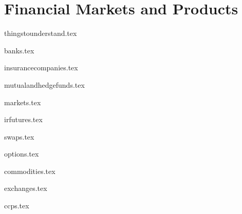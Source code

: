 \documentclass{report}
\begin{document}
	

\tableofcontents		

\part{Financial Markets and Products}

{thingstounderstand.tex}
\pagebreak

{banks.tex}
\pagebreak

{insurancecompanies.tex}
\pagebreak

{mutualandhedgefunds.tex}
\pagebreak

{markets.tex}
\pagebreak

{irfutures.tex}
\pagebreak

{swaps.tex}
\pagebreak

{options.tex}
\pagebreak

{commodities.tex}
\pagebreak

{exchanges.tex}
\pagebreak

{ccps.tex}
\pagebreak
\end{document}
